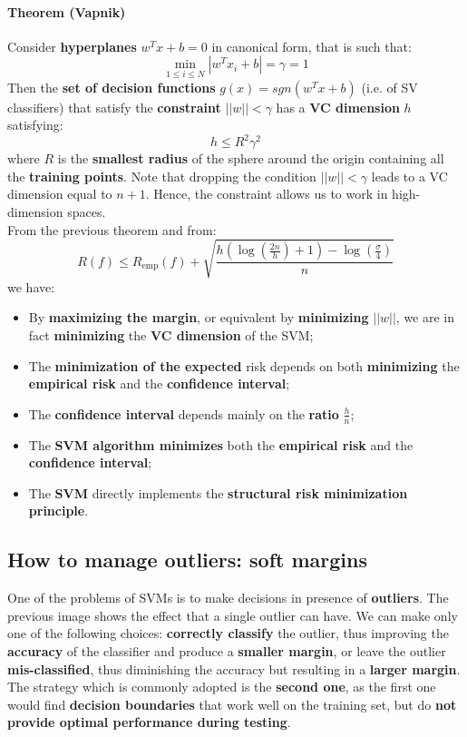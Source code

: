 \paragraph{Theorem (Vapnik)} Consider \textbf{hyperplanes} $w^Tx+b= 0$ in canonical form, that is such that:
$$\min\limits_{1\leq i \leq N}|w^Tx_i+b| = \gamma = 1$$
Then the \textbf{set of decision functions} $g(x) = sgn(w^Tx+b)$ (i.e. of SV classifiers) that satisfy the \textbf{constraint} $||w|| < \gamma$ has a \textbf{VC dimension} $h$ satisfying:
$$h \leq R^2\gamma^2$$
where $R$ is the \textbf{smallest radius} of the sphere around the origin containing all the \textbf{training points}. Note that dropping the condition $||w|| < \gamma$ leads to a VC dimension equal to $n+1$. Hence, the constraint allows us to work in high-dimension spaces. \\
From the previous theorem and from:
$$R(f) \leq R_{\text{emp}}(f) + \sqrt{\frac{h(\log(\frac{2n}{h})+1)-\log(\frac{\sigma}{4})}{n}}$$
we have:
\begin{itemize}
	\item By \textbf{maximizing the margin}, or equivalent by \textbf{minimizing} $||w||$, we are in fact \textbf{minimizing} the \textbf{VC dimension} of the SVM;
	\item The \textbf{minimization of the expected} risk depends on both \textbf{minimizing} the \textbf{empirical risk} and the \textbf{confidence interval};
	\item The \textbf{confidence interval} depends mainly on the \textbf{ratio} $\frac{h}{n}$;
	\item The \textbf{SVM algorithm minimizes} both the \textbf{empirical risk} and the \textbf{confidence interval};
	\item The \textbf{SVM} directly implements the \textbf{structural risk minimization principle}.
\end{itemize}

\subsection{How to manage outliers: soft margins}
One of the problems of SVMs is to make decisions in presence of \textbf{outliers}.
The previous image shows the effect that a single outlier can have. We can make only one of the following choices: \textbf{correctly classify} the outlier, thus improving the \textbf{accuracy} of the classifier and produce a \textbf{smaller margin}, or leave the outlier \textbf{mis-classified}, thus diminishing the accuracy but resulting in a \textbf{larger margin}. The strategy which is commonly adopted is the \textbf{second one}, as the first one would find \textbf{decision boundaries} that work well on the training set, but do \textbf{not provide optimal performance during testing}. 

